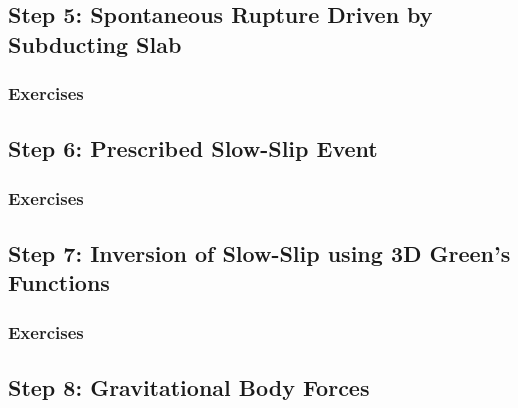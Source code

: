 


\subsection{Step 5: Spontaneous Rupture Driven by Subducting Slab}

\subsubsection{Exercises}

\subsection{Step 6: Prescribed Slow-Slip Event}

\subsubsection{Exercises}


\subsection{Step 7: Inversion of Slow-Slip using 3D Green's Functions}

\subsubsection{Exercises}


\subsection{Step 8: Gravitational Body Forces}


